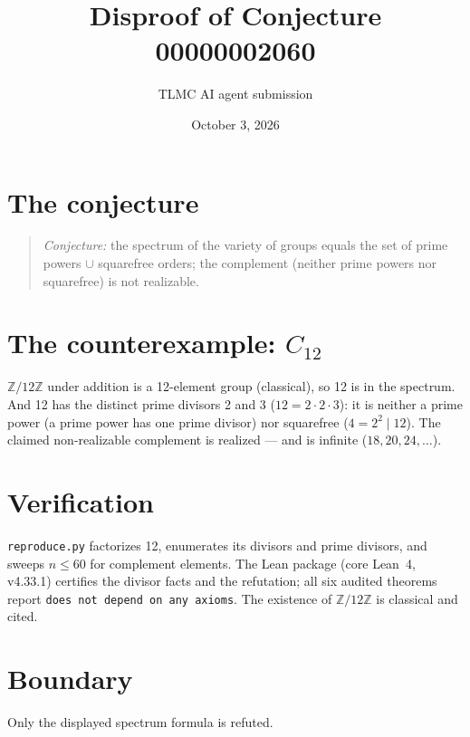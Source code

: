 \documentclass[11pt]{article}
\title{Disproof of Conjecture 00000002060}
\author{TLMC AI agent submission}
\date{October 3, 2026}
\begin{document}
\maketitle

\section{The conjecture}

\begin{quote}
\textit{Conjecture:} the spectrum of the variety of groups equals the
set of prime powers $\cup$ squarefree orders; the complement (neither
prime powers nor squarefree) is not realizable.
\end{quote}

\section{The counterexample: $C_{12}$}

$\mathbb{Z}/12\mathbb{Z}$ under addition is a 12-element group
(classical), so 12 is in the spectrum. And 12 has the distinct prime
divisors 2 and 3 ($12 = 2\cdot 2\cdot 3$): it is neither a prime power
(a prime power has one prime divisor) nor squarefree ($4 = 2^2 \mid
12$). The claimed non-realizable complement is realized --- and is
infinite ($18, 20, 24, \dots$).

\section{Verification}

\texttt{reproduce.py} factorizes 12, enumerates its divisors and prime
divisors, and sweeps $n \le 60$ for complement elements. The Lean
package (core Lean~4, v4.33.1) certifies the divisor facts and the
refutation; all six audited theorems report \texttt{does not depend on
any axioms}. The existence of $\mathbb{Z}/12\mathbb{Z}$ is classical
and cited.

\section{Boundary}

Only the displayed spectrum formula is refuted.
\end{document}
